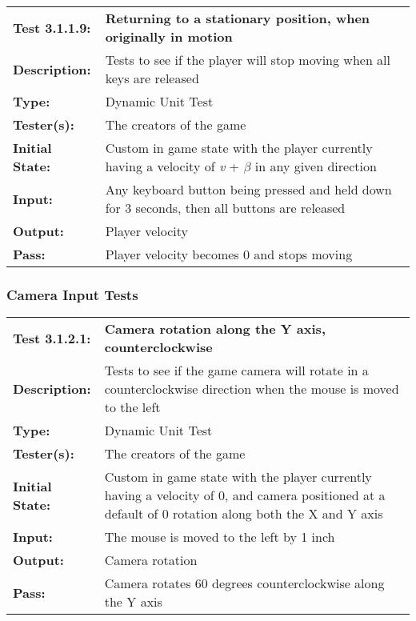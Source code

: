 \documentclass[12pt, titlepage]{article}
\begin{document}
\begin{enumerate}
\begin{mdframed}[linewidth=1pt]
\begin{tabularx}{\textwidth}{@{}p{3cm}X@{}}
{\bf Test 3.1.1.9:} & {\bf Returning to a stationary position, when originally in motion}\\[\baselineskip]
{\bf Description:} & Tests to see if the player will stop moving when all keys are released\\[0.5\baselineskip]
{\bf Type:} & Dynamic Unit Test\\[0.5\baselineskip]
{\bf Tester(s):} & The creators of the game\\[0.5\baselineskip]
{\bf Initial State:} & Custom in game state with the player currently having a velocity of \textit{v} + $\beta$ in any given direction\\[0.5\baselineskip]
{\bf Input:} & Any keyboard button being pressed and held down for 3 seconds, then all buttons are released \\[0.5\baselineskip]
{\bf Output:} & Player velocity\\[0.5\baselineskip]
{\bf Pass:} & Player velocity becomes 0 and stops moving
\end{tabularx}
\end{mdframed}

\subsubsection{Camera Input Tests}
\begin{mdframed}[linewidth=1pt]
\begin{tabularx}{\textwidth}{@{}p{3cm}X@{}}
{\bf Test 3.1.2.1:} & {\bf Camera rotation along the Y axis, counterclockwise}\\[\baselineskip]
{\bf Description:} & Tests to see if the game camera will rotate in a counterclockwise direction when the mouse is moved to the left\\[0.5\baselineskip]
{\bf Type:} & Dynamic Unit Test\\[0.5\baselineskip]
{\bf Tester(s):} & The creators of the game\\[0.5\baselineskip]
{\bf Initial State:} & Custom in game state with the player currently having a velocity of 0, and camera positioned at a default of 0 rotation along both the X and Y axis\\[0.5\baselineskip]
{\bf Input:} & The mouse is moved to the left by 1 inch\\[0.5\baselineskip]
{\bf Output:} & Camera rotation\\[0.5\baselineskip]
{\bf Pass:} & Camera rotates 60 degrees counterclockwise along the Y axis
\end{tabularx}
\end{mdframed}


\end{enumerate}
\end{document}

